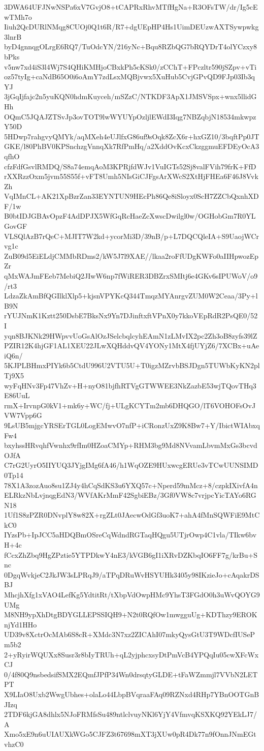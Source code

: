 3DWA64UFJNwNSPa6xV7GvjO8+tCAPRxRhvMTfHgNa+R3OFsTW/dr/Ig5cEwTMh7o
Iiuh2QcDURlNMqg8CUOj0Q1t6R/R7+dgUEpHP4Hs1UimDEUzwAXTSywpwkg3lnrB
byD4gnnqgOLrgE6RQ7/TuOdcYN/216yNc+Bqu8RZbQG7bRQYDrT4olYCzxy8bPks
v5nw7xd4iS3l4Wj7S4QHiKMHjoCBxkPh5cKSk0/zCChT+FPczltr590jSZpv+vTi
oz57tyIg+caNdB65O0i6oAmY7zdLsxMQBjvwx5XuHub5CvjGPvQD9FJp03Ib3qYJ
3jGqIjfajc2n5yuKQN0hdmKuyceh/mSZzC/NTKDF3ApX1JMSVSpx+wnx5llidGHh
OQmC5JQAJZTSvJp3ovTOT9lwWYUYpOzljlEWdI3Iqg7NBZqbjN18534mkwpzY50D
5HDwp7rahgvyQMYk/aqMXeh4eUJlfxG86uf9sOqk8ZcX6r+hxGZ10/3bqftPp0JT
GKE/l80PhBV0KPSnchzgVnnqXk7RfPmHq/a2XddOvKcxCkzggmuEFDEyOcA3qfhO
cfzFdfGsvlRMDQ/S8a74emqAoM3KPRjfdWJv1VuIGTs52Sj8valFVih79frK+FfD
rXXRzzOxm5jvm55S55f+vFT8Umh5NIsGiCJFgsArXWcS2XtHjFHEa6F46J8VvkZh
VqIMnCL+AK21XpBzrZan33EYNTUN9HEcPh86Qe8iSloyx0ScH7ZZCbQxnhXDF/1w
B0btIDJGBAvOpzF4AdDPJX5WfGqRcHaeZcXwscDwilgl0w/OGHobGm7R0YLGovGF
VLSQlAzB7rQeC+MJIT7W2kd+ycorMi3D/39nB/p+L7DQCQleIA+S9UaojWCrvg1c
ZuB09d5EiELdjCMMbRDms2/kW5J7l9XAE//lkaa2roFfUDgKWFo0aIIHpwozEpZr
qMxWAJmFEeb7MebiQ2JIwW6np7fWiRER3DBZrxSMItj6e4GKv6sIPUWoV/o9/rt3
LdzaZkAmBfQGIlklXlp5+kjsnVPYKcQ344TmqzMYAnrgvZUM0W2Ceaa/3Py+lB9N
rYUJNmK1Kztt250DsbE7BksNx9Yn7DJinftxftVPnX0y7kkoVEpRdR2PsQE0/52I
yqn8BJKNk29HWpvvUoGsAlOzJSelcbqlcyhEAmN1zLMvIX2pc2Zh3oB8zyfs39lZ
PZIR12K4hjGF1AL1XEU22JLwXQHddvQV4YONy1MtX4fjUYjZ6/7XCBx+uAeiQ6n/
5KJPLBHmxPIYk6b5CtdU996U2VTU5U+T0igzMZrvbBSJDgn5TUWbKyKN2plTj9X5
wyFqHNv3Fp47VhZv+H+nyO81bjfhRTVgGTWWEE3NkZazbE53wjTQovTHq3E86UuL
rmX+IrvnpG0kV1+mk6y+WC/fj+ULgKCYTm2mb6DHQGO/lT6VOHOFsOvJVW7Vpp6G
9LsUB5mjgcYRSErTGL0LogEMwvO7nfP+iCRonzUxZ9K8Bw7+Y/IbictWIAbxqFw4
bxyhssHRvqhfVwnhx9rfIm0HZoaCMYp+RHM3bg9Md8NVvamLbvmMxGs3bcvdOJfA
C7rG2UyrO5IIYUQ3JYjgIMg6fA46/h1WqOZE9HUxwcgERUe3vTCwUUNSIMD0Tp14
78X1A3zozAuo8su1ZJ4y4hCqSdKS3u6YXQ57c+Nperd59mMcz+8/czpkIXivfA4n
ELRkzNbLvjnqgEdN3/WVfAKrMmF42SgbiEBz/3Gf0VW8c7vrjpcYicTAYo6RGN18
1Uf1S8zPZR0DNvplY8w82X+rgZLt0JAecwOdGf3uoK7+ahA4fMnSQWFiE9MtCkC0
IYzsPb+IpJCC5aHDQBmOSreCqWdndRGTaqHQgu5UTjrOwp4C1vla/TIkw6bvH+4c
fCcxZhZbq9HgZPztie5YTPDkwY4nE3/kVGB6gI1iXRvDZKbqIO6FF7g/krBu+Snc
0DgqWvkjeC2JkJW3sLPRqJ9/aTPqDRuWvHSYUHk3405y98IKzieJo+cAqakrDSBJ
MhcjhXfg1xVAO4LefKg5YdtitRt/tXbpVdOwpHMc9YhsT3FGdO0h3uWvQOYG9UMg
M8NH9ypXhDtgBDYGLLEPSSIQH9+N2t0RQfOw1mwgguUg+KDThzy9EROKnjYd1HHo
UD39v8XctrOcMAb6S8cR+XMdc3N7xz2ZICAhI07mkyQysGtU3T9WDcfIUSePm5b2
2+yRyirWQUXx8Susr3r8bIyTRUh+qL2yjphcxsyDtPmVcB4YPQqIu05cwXFcWxCJ
0/4f80Q9nsbedsifSMX2EQmfJPfP34Wn0drsqtyGLDE+tFaWZmmjl7VVbN2LETPT
X9LIaO8Uxb2WwgUbhes+olaLo44LbpBVqraaFAq09RZNxd4RHp7YBnOOTGnBJIzq
2TDF6kjGA8dhlx5NJoFRMfsSu489ntlclvuyNKl6YjY4VfmvqKSXKQ92YEkLJ7/A
Xmo5xE9n6uUIAUXkWGo5CJFZ3t67698mXT3jXUw0pR4Dk77n9fOnnJNmEGtvhzC0
